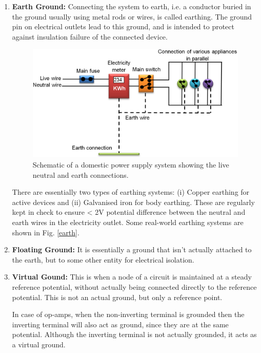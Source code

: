 \begin{enumerate}
    \item \textbf{Earth Ground:} Connecting the system to earth, i.e. a conductor buried in the ground usually using metal rods or wires, is called earthing. The ground pin on electrical outlets lead to this ground, and is intended to protect against insulation failure of the connected device.
    \begin{figure}[H]
        \centering
        \includegraphics[width=0.85\columnwidth]{images/domestic.png}
        \caption{Schematic of a domestic power supply system showing the live neutral and earth connections.}
        \label{dom}
    \end{figure}
    There are essentially two types of earthing systems: (i) Copper earthing for active devices and (ii) Galvanised iron for body earthing. These are regularly kept in check to ensure < 2V potential difference between the neutral and earth wires in the electricity outlet. Some real-world earthing systems are shown in Fig. \ref{earth}. 
    \item \textbf{Floating Ground:} It is essentially a ground that isn't actually attached to the earth, but to some other entity for electrical isolation.
    \item \textbf{Virtual Gound:} This is when a node of a circuit is maintained at a steady reference potential, without actually being connected directly to the reference potential. This is not an actual ground, but only a reference point. 
    
    In case of op-amps, when the non-inverting terminal is grounded then the inverting terminal will also act as ground, since they are at the same potential. Although the inverting terminal is not actually grounded, it acts as a virtual ground.\\
\end{enumerate}

